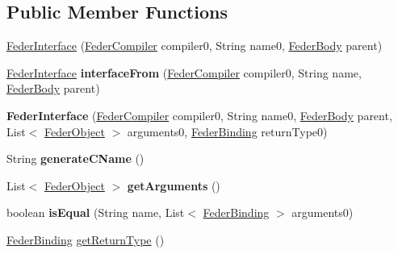 \subsection*{Public Member Functions}
\begin{DoxyCompactItemize}
\item 
\hyperlink{classfeder_1_1types_1_1FederInterface_abf8041a965038ca41879cecb74978b23}{Feder\+Interface} (\hyperlink{classfeder_1_1FederCompiler}{Feder\+Compiler} compiler0, String name0, \hyperlink{classfeder_1_1types_1_1FederBody}{Feder\+Body} parent)
\item 
\mbox{\label{classfeder_1_1types_1_1FederInterface_a934a3b6f546097139d839012754f8d39}} 
\hyperlink{classfeder_1_1types_1_1FederInterface}{Feder\+Interface} {\bfseries interface\+From} (\hyperlink{classfeder_1_1FederCompiler}{Feder\+Compiler} compiler0, String name, \hyperlink{classfeder_1_1types_1_1FederBody}{Feder\+Body} parent)
\item 
\mbox{\label{classfeder_1_1types_1_1FederInterface_a38f609c2c8732592f95faf260be7edd9}} 
{\bfseries Feder\+Interface} (\hyperlink{classfeder_1_1FederCompiler}{Feder\+Compiler} compiler0, String name0, \hyperlink{classfeder_1_1types_1_1FederBody}{Feder\+Body} parent, List$<$ \hyperlink{classfeder_1_1types_1_1FederObject}{Feder\+Object} $>$ arguments0, \hyperlink{classfeder_1_1types_1_1FederBinding}{Feder\+Binding} return\+Type0)
\item 
\mbox{\label{classfeder_1_1types_1_1FederInterface_aeb4995b722e176b73a9a128d7047de9b}} 
String {\bfseries generate\+C\+Name} ()
\item 
\mbox{\label{classfeder_1_1types_1_1FederInterface_aa84c636d337ec5e39f5b3bf51587b4ae}} 
List$<$ \hyperlink{classfeder_1_1types_1_1FederObject}{Feder\+Object} $>$ {\bfseries get\+Arguments} ()
\item 
\mbox{\label{classfeder_1_1types_1_1FederInterface_ae707b0cfcde306b04c757d554178e6ee}} 
boolean {\bfseries is\+Equal} (String name, List$<$ \hyperlink{classfeder_1_1types_1_1FederBinding}{Feder\+Binding} $>$ arguments0)
\item 
\hyperlink{classfeder_1_1types_1_1FederBinding}{Feder\+Binding} \hyperlink{classfeder_1_1types_1_1FederInterface_a3fecf39c73125eeaf51a33ddfbdc9f91}{get\+Return\+Type} ()

\end{DoxyCompactItemize}
